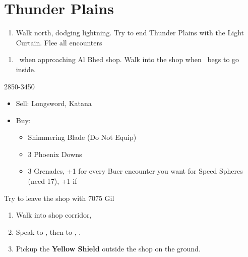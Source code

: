 \chapter{Thunder Plains}

\begin{enumerate}
	\item Walk north, dodging lightning. Try to end Thunder Plains with the Light Curtain. Flee all encounters
\end{enumerate}
\begin{enumerate}[resume]
	\item \sd\ when approaching Al Bhed shop. Walk into the shop when \rikku\ begs to go inside.
\end{enumerate}
\begin{shop}{2850-3450}
	\begin{itemize}
		\item Sell: Longsword, Katana
		\item Buy:
		      \begin{itemize}
			      \item Shimmering Blade (Do Not Equip)
			      \item 3 Phoenix Downs
			      \item 3 Grenades, +1 for every Buer encounter you want for Speed Spheres (need 17), +1 if \blitzloss
		      \end{itemize}
	\end{itemize}
	Try to leave the shop with 7075 Gil
\end{shop}
\begin{enumerate}[resume]
	\item Walk into shop corridor, \cs[2:00]
	\item Speak to \auron, then to \rikku, \sd.
	\item Pickup the \textbf{Yellow Shield} outside the shop on the ground.
\end{enumerate}

